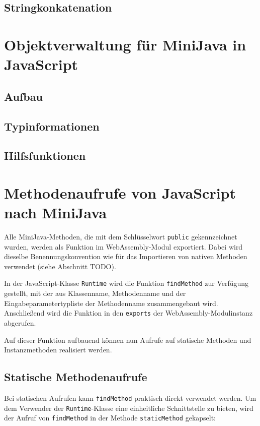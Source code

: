 \subsection{Stringkonkatenation}

\section{Objektverwaltung für MiniJava in JavaScript}
\subsection{Aufbau}
\subsection{Typinformationen}
\subsection{Hilfsfunktionen}

\section{Methodenaufrufe von JavaScript nach MiniJava}

Alle MiniJava-Methoden, die mit dem Schlüsselwort \lstinline{public} gekennzeichnet wurden, werden als Funktion im WebAssembly-Modul exportiert. Dabei wird dieselbe Benennungskonvention wie für das Importieren von nativen Methoden verwendet (siehe Abschnitt TODO).

In der JavaScript-Klasse \lstinline{Runtime} wird die Funktion \lstinline{findMethod} zur Verfügung gestellt, mit der aus Klassenname, Methodenname und der Eingabeparametertypliste der Methodenname zusammengebaut wird. Anschließend wird die Funktion in den \lstinline{exports} der WebAssembly-Modulinstanz abgerufen.



Auf dieser Funktion aufbauend können nun Aufrufe auf statische Methoden und Instanzmethoden realisiert werden.

\subsection{Statische Methodenaufrufe}

Bei statischen Aufrufen kann \lstinline{findMethod} praktisch direkt verwendet werden. Um dem Verwender der \lstinline{Runtime}-Klasse eine einheitliche Schnittstelle zu bieten, wird der Aufruf von \lstinline{findMethod} in der Methode \lstinline{staticMethod} gekapselt:


